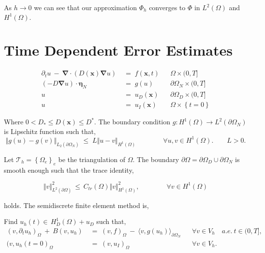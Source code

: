 \documentclass[10pt]{report}
\numberwithin{equation}{section}
\begin{document}
\noindent
As $h \rightarrow 0$ we can see that our approximation $\Phi_{h}$ converges to $\Phi$ in $L^{2}(\Omega)$ and $H^{1}(\Omega)$.



\vspace{5mm}



\chapter{Time Dependent Error Estimates}


\begin{align}
\partial_{t} u \ - \ \boldsymbol \nabla \cdot ( D(\textbf{x}) \boldsymbol \nabla u) \; &= \; f(\textbf{x},t) &&  \Omega \times (0,T]  \\
(-D \boldsymbol \nabla u ) \cdot \boldsymbol \eta_{N} \; &= \; g(u) && \partial \Omega_{N} \times (0,T]  \\
u \; &= \; u_{D}(\textbf{x}) &&  \partial \Omega_{D} \times (0,T] \\
u \; &= \; u_{I}(\textbf{x}) &&  \Omega \times \left\{ t=0 \right\}
\end{align}


Where $0 < D_{*} \leq D(\textbf{x}) \leq D^{*}$.  The boundary condition $g: H^{1}(\Omega) \rightarrow L^{2}(\partial \Omega_{N})$ is Lipschitz function such that,
\begin{equation}
\Vert g(u) - g(v) \Vert_{L_{2}(\partial \Omega_{N})} \; \leq \; L
\Vert u - v \Vert_{H^{1}(\Omega)} \qquad \qquad \forall u,v \in H^{1}(\Omega).  \qquad L > 0.
\end{equation}



Let $\mathcal{T}_{h} = \left\{ \Omega_{e} \right\}_{e}$ be the triangulation of $\Omega$. The boundary $\partial \Omega = \partial \Omega_{D} \cup \partial \Omega_{N}$ is smooth enough such that the trace identity,


\begin{equation}
\Vert v \Vert^{2}_{L^{2}(\partial \Omega)} \, \leq \, C_{tr}(\Omega) \Vert v \Vert^{2}_{H^{1}(\Omega)}, \qquad \qquad 
\forall v \in H^{1}(\Omega) \label{eq:Trace}
\end{equation}


\noindent
holds.  The semidiscrete finite element method is, \newline

Find $u_{h}(t) \in \, H^{1}_{D}(\Omega) + u_{D}$ such that,
\begin{align}
(v,\partial_{t} u_{h})_{\Omega} \ + \ B(v,u_{h}) \; &= \; (v,f)_{\Omega} \ - \ \langle v, g(u_{h}) \rangle_{\partial \Omega_{N}} && \forall v \in V_{h} \quad   a.e. \ t \in (0,T], \label{eq:fem} \\
(v,u_{h}(t=0)_{\Omega} \; &= \; (v,u_{I})_{\Omega} && \forall v \in V_{h} \label{eq:fem_init}.
\end{align}
\end{document}
